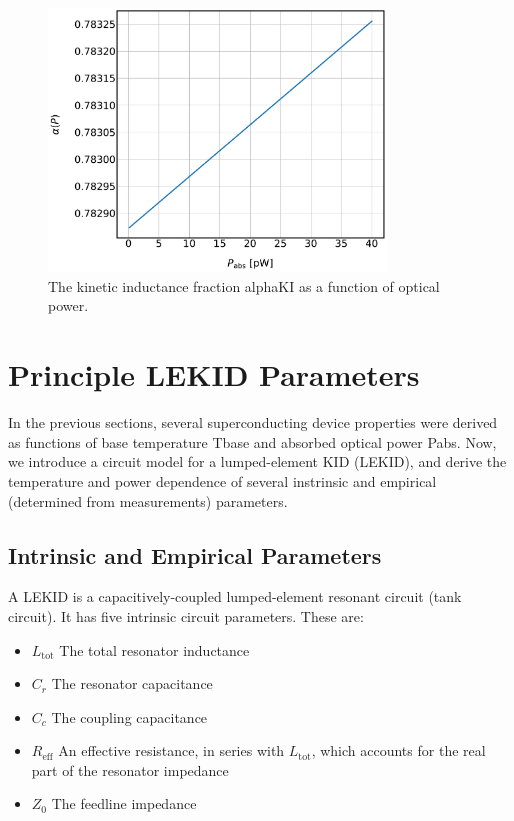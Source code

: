 \begin{figure}[!htbp]
\centering
\includegraphics[width=0.8\textwidth]{figures/kid_model/alpha_P}
\caption[~ as a function of absorbed power.]{The kinetic inductance fraction \gls{alphaKI} as a function of optical power.}
\label{fig:alpha_P}
\end{figure}

\section{Principle LEKID Parameters}\label{sec:kid_params}

In the previous sections, several superconducting device properties were derived as functions of base temperature \gls{Tbase} and absorbed optical power \gls{Pabs}. Now, we introduce a circuit model for a lumped-element KID (LEKID), and derive the temperature and power dependence of several instrinsic and empirical (determined from measurements) parameters.

\subsection{Intrinsic and Empirical Parameters}

A LEKID is a capacitively-coupled lumped-element resonant circuit (tank circuit). It has five intrinsic circuit parameters. These are:

\begin{itemize}[label={},nosep]
  \item $L_{\mathrm{tot}}$ \quad The total resonator inductance
  \item $C_{r}$ \quad The resonator capacitance
  \item $C_{c}$ \quad The coupling capacitance
  \item $R_{\mathrm{eff}}$ \quad An effective resistance, in series with $L_{\mathrm{tot}}$, which accounts for the real part of the resonator impedance
  \item $Z_{0}$ \quad The feedline impedance
\end{itemize}

